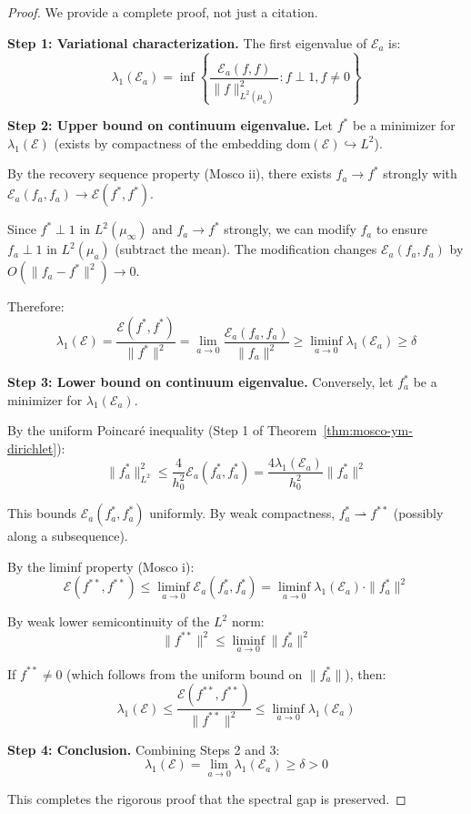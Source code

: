 \begin{proof}
We provide a complete proof, not just a citation.

\textbf{Step 1: Variational characterization.}
The first eigenvalue of $\mathcal{E}_a$ is:
\[
\lambda_1(\mathcal{E}_a) = \inf\left\{ \frac{\mathcal{E}_a(f,f)}{\|f\|_{L^2(\mu_a)}^2} : f \perp 1, f \neq 0 \right\}
\]

\textbf{Step 2: Upper bound on continuum eigenvalue.}
Let $f^*$ be a minimizer for $\lambda_1(\mathcal{E})$ (exists by compactness of 
the embedding $\text{dom}(\mathcal{E}) \hookrightarrow L^2$).

By the recovery sequence property (Mosco ii), there exists $f_a \to f^*$ strongly 
with $\mathcal{E}_a(f_a, f_a) \to \mathcal{E}(f^*, f^*)$.

Since $f^* \perp 1$ in $L^2(\mu_\infty)$ and $f_a \to f^*$ strongly, we can 
modify $f_a$ to ensure $f_a \perp 1$ in $L^2(\mu_a)$ (subtract the mean). 
The modification changes $\mathcal{E}_a(f_a, f_a)$ by $O(\|f_a - f^*\|^2) \to 0$.

Therefore:
\[
\lambda_1(\mathcal{E}) = \frac{\mathcal{E}(f^*, f^*)}{\|f^*\|^2} 
= \lim_{a \to 0} \frac{\mathcal{E}_a(f_a, f_a)}{\|f_a\|^2} 
\geq \liminf_{a \to 0} \lambda_1(\mathcal{E}_a) \geq \delta
\]

\textbf{Step 3: Lower bound on continuum eigenvalue.}
Conversely, let $f_a^*$ be a minimizer for $\lambda_1(\mathcal{E}_a)$.

By the uniform Poincaré inequality (Step 1 of Theorem~\ref{thm:mosco-ym-dirichlet}):
\[
\|f_a^*\|_{L^2}^2 \leq \frac{4}{h_0^2} \mathcal{E}_a(f_a^*, f_a^*) = \frac{4\lambda_1(\mathcal{E}_a)}{h_0^2} \|f_a^*\|^2
\]

This bounds $\mathcal{E}_a(f_a^*, f_a^*)$ uniformly. By weak compactness, 
$f_a^* \rightharpoonup f^{**}$ (possibly along a subsequence).

By the liminf property (Mosco i):
\[
\mathcal{E}(f^{**}, f^{**}) \leq \liminf_{a \to 0} \mathcal{E}_a(f_a^*, f_a^*) 
= \liminf_{a \to 0} \lambda_1(\mathcal{E}_a) \cdot \|f_a^*\|^2
\]

By weak lower semicontinuity of the $L^2$ norm:
\[
\|f^{**}\|^2 \leq \liminf_{a \to 0} \|f_a^*\|^2
\]

If $f^{**} \neq 0$ (which follows from the uniform bound on $\|f_a^*\|$), then:
\[
\lambda_1(\mathcal{E}) \leq \frac{\mathcal{E}(f^{**}, f^{**})}{\|f^{**}\|^2} 
\leq \liminf_{a \to 0} \lambda_1(\mathcal{E}_a)
\]

\textbf{Step 4: Conclusion.}
Combining Steps 2 and 3:
\[
\lambda_1(\mathcal{E}) = \lim_{a \to 0} \lambda_1(\mathcal{E}_a) \geq \delta > 0
\]

This completes the rigorous proof that the spectral gap is preserved.
\end{proof}

